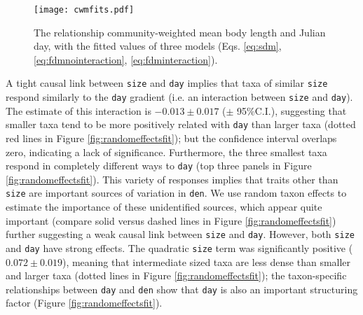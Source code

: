 \documentclass[12pt]{ecology}
\begin{document}
\begin{figure}
\texttt{[image: cwmfits.pdf]}
\caption{The relationship community-weighted mean body length and Julian day, with the fitted values of three models (Eqs. \ref{eq:sdm}, \ref{eq:fdmnointeraction}, \ref{eq:fdminteraction}).}%
\label{fig:cwmfits}
\end{figure}

A tight causal link between \texttt{size} and \texttt{day} implies that taxa of similar \texttt{size} respond similarly to the \texttt{day} gradient (i.e. an interaction between \texttt{size} and \texttt{day}).  The estimate of this interaction is $-0.013 \pm 0.017$ ($\pm$ 95\%C.I.), suggesting that smaller taxa tend to be more positively related with \texttt{day} than larger taxa (dotted red lines in Figure \ref{fig:randomeffectsfit}); but the confidence interval overlaps zero, indicating a lack of significance.  Furthermore, the three smallest taxa respond in completely different ways to \texttt{day} (top three panels in Figure \ref{fig:randomeffectsfit}).  This variety of responses implies that traits other than \texttt{size} are important sources of variation in \texttt{den}.  We use random taxon effects to estimate the importance of these unidentified sources, which appear quite important (compare solid versus dashed lines in Figure \ref{fig:randomeffectsfit}) further suggesting a weak causal link between \texttt{size} and \texttt{day}.  However, both \texttt{size} and \texttt{day} have strong effects.  The quadratic \texttt{size} term was significantly positive ($0.072 \pm 0.019$), meaning that intermediate sized taxa are less dense than smaller and larger taxa (dotted lines in Figure \ref{fig:randomeffectsfit}); the taxon-specific relationships between \texttt{day} and \texttt{den} show that \texttt{day} is also an important structuring factor (Figure \ref{fig:randomeffectsfit}).




\end{document}
